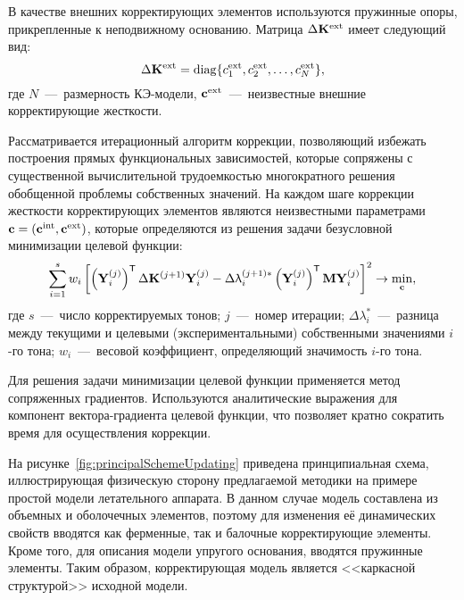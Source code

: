 В качестве внешних корректирующих элементов используются пружинные опоры, прикрепленные к неподвижному основанию. Матрица $ \Delta \mathbf{K} ^ {\text{ext}} $ имеет следующий вид:
\begin{equation}
	\Delta \mathbf{K} ^ {\text{ext}} = \operatorname{diag} \{ c ^ {\text{ext}}_1, c ^ {\text{ext}}_2, \hdots, c ^ {\text{ext}}_N \}, \label{eq:externalStiffMatrix}
\end{equation}
где $ N $~---~размерность КЭ-модели, $ \mathbf{c} ^ {\text{ext}} $~---~неизвестные внешние корректирующие жесткости. 

Рассматривается итерационный алгоритм коррекции, позволяющий избежать построения прямых функциональных зависимостей, которые сопряжены с существенной вычислительной трудоемкостью многократного решения обобщенной проблемы собственных значений. На каждом шаге коррекции жесткости корректирующих элементов являются неизвестными параметрами $ \mathbf{c} = \left( \mathbf{c} ^ {\text{int}}, \mathbf{c} ^ {\text{ext}} \right) $, которые определяются из решения задачи безусловной минимизации целевой функции:
\begin{gather}
	\sum\limits_{i = 1} ^ s w_i \left[ \left( \mathbf{Y}_i ^ {(j)} \right) ^ \mathsf{T} \Delta \mathbf{K} ^ {(j + 1)} \mathbf{Y}_i ^ {(j)} - \Delta \uplambda_i ^ {(j + 1) \ast} \left( \mathbf{Y}_i ^ {(j)} \right) ^ \mathsf{T} \mathbf{M} \mathbf{Y}_i ^ {(j)} \right] ^ 2 \rightarrow \min_{\mathbf{c}},
\end{gather}
где $ s $~---~число корректируемых тонов; $ j $~---~номер итерации; $ \Delta \lambda_i ^ {\ast}$~---~разница между текущими и целевыми (экспериментальными) собственными значениями $ i $-го тона; $ w_i $~---~весовой коэффициент, определяющий значимость $ i $-го тона.

Для решения задачи минимизации целевой функции применяется метод сопряженных градиентов. Используются аналитические выражения для компонент вектора-градиента целевой функции, что позволяет кратно сократить время для осуществления коррекции.

На рисунке~\ref{fig:principalSchemeUpdating} приведена принципиальная схема, иллюстрирующая физическую сторону предлагаемой методики на примере простой модели летательного аппарата. В данном случае модель составлена из объемных и оболочечных элементов, поэтому для изменения её динамических свойств вводятся как ферменные, так и балочные корректирующие элементы. Кроме того, для описания модели упругого основания, вводятся пружинные элементы. Таким образом, корректирующая модель является <<каркасной структурой>> исходной модели.

